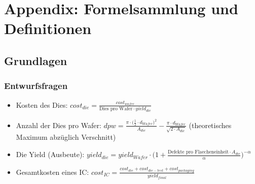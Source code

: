 \section{Appendix: Formelsammlung und Definitionen}

\subsection{Grundlagen}

\subsubsection{Entwurfsfragen}
\begin{itemize}
	\item Kosten des Dies: \(cost_{die} = \frac{cost_{wafer}}{\text{Dies pro Wafer} \cdot yield_{die}}\)
	\item Anzahl der Dies pro Wafer: \(dpw = \frac{\pi \cdot \big(\frac{1}{2} \cdot d_{Wafer}\big)^2}{A_{die}} - \frac{\pi \cdot d_{Wafer}}{\sqrt{2 \cdot A_{die}}}\) (theoretisches Maximum abzüglich Verschnitt)
	\item Die Yield (Ausbeute): \(yield_{die} = yield_{Wafer} \cdot \Big(1+\frac{\text{Defekte pro Flaecheneinheit} \cdot A_{die}}{\alpha}\Big)^{-\alpha}\)
	\item Gesamtkosten eines IC: \(cost_{IC} = \frac{cost_{die}+cost_{die-test}+cost_{packaging}}{yield_{final}}\)
\end{itemize}


